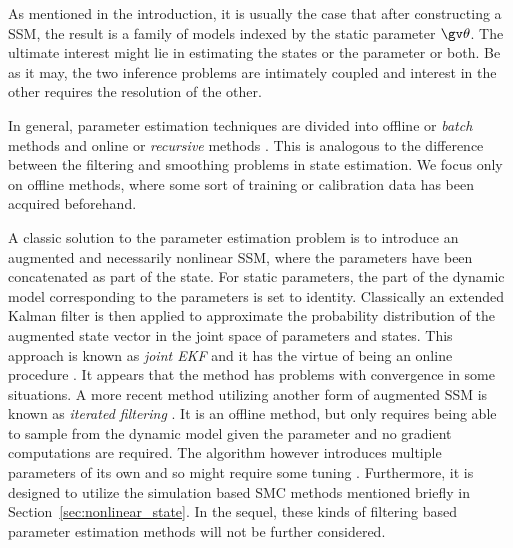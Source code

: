 
As mentioned in the introduction, it is usually the case that
after constructing a SSM, the result is a family of models
indexed by the static parameter $\Th$. The ultimate interest might lie in estimating
the states or the parameter or both. Be as it may, the two inference problems are intimately
coupled and interest in the other requires the resolution of the other.

In general, parameter estimation techniques are divided
into offline or \emph{batch} methods and online or \emph{recursive} methods
\parencite{Cappe2007,Kantas2009}. This is analogous to the difference between the filtering and 
smoothing problems in state estimation. We focus only on offline methods, where some 
sort of training or calibration data has been acquired beforehand.

A classic solution to the parameter estimation problem is to introduce
an augmented and necessarily nonlinear SSM, where the parameters have been concatenated as part of the
state. For static parameters, the part of the dynamic model corresponding to the parameters is
set to identity. Classically an extended Kalman filter is 
then applied to approximate the probability distribution of the augmented state
vector in the joint space of parameters and states. This approach is known
as \emph{joint EKF} and it has the virtue of being an online procedure \parencite{Wan2001}.
It appears that the method has problems with convergence in some situations.
A more recent method utilizing another form of augmented SSM is known as \emph{iterated filtering}
\parencite{Ionides2011}. It is an offline method, but only requires being able
to sample from the dynamic model given the parameter and no gradient computations
are required. The algorithm however introduces multiple parameters of its own
and so might require some tuning \parencite{Kantas2009}. Furthermore, it is designed
to utilize the simulation based SMC methods mentioned briefly in Section~\ref{sec:nonlinear_state}.
In the sequel, these kinds of filtering based parameter estimation methods 
will not be further considered. 




